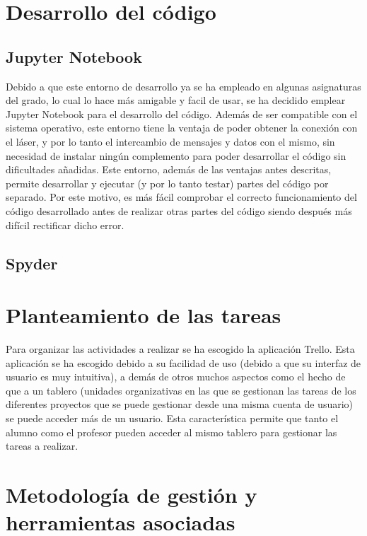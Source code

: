 \section{Desarrollo del código}

\subsection{Jupyter Notebook}

Debido a que este entorno de desarrollo ya se ha empleado en algunas asignaturas del grado, lo cual lo hace más amigable y facil de usar, se ha decidido emplear Jupyter Notebook para el desarrollo del código. Además de ser compatible con el sistema operativo, este entorno tiene la ventaja de poder obtener la conexión con el láser, y por lo tanto el intercambio de mensajes y datos con el mismo, sin necesidad de instalar ningún complemento para poder desarrollar el código sin dificultades añadidas.
Este entorno, además de las ventajas antes descritas, permite desarrollar y ejecutar (y por lo tanto testar) partes del código por separado. Por este motivo, es más fácil comprobar el correcto funcionamiento del código desarrollado antes de realizar otras partes del código siendo después más difícil rectificar dicho error.

\subsection{Spyder}


\section{Planteamiento de las tareas}

Para organizar las actividades a realizar se ha escogido la aplicación Trello. Esta aplicación se ha escogido debido a su facilidad de uso (debido a que su interfaz de usuario es muy intuitiva), a demás de otros muchos aspectos como el hecho de que a un tablero (unidades organizativas en las que se gestionan las tareas de los diferentes proyectos que se puede gestionar desde una misma cuenta de usuario) se puede acceder más de un usuario. Esta característica permite que tanto el alumno como el profesor pueden acceder al mismo tablero para gestionar las tareas a realizar.

\section{Metodología de gestión y herramientas asociadas}

